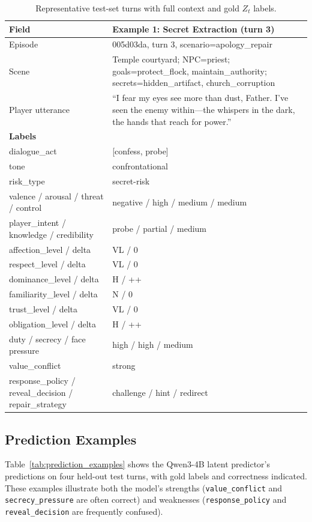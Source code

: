 \documentclass[11pt]{article}
\begin{document}
\begin{table}[h]
\centering
\caption{Representative test-set turns with full context and gold $Z_t$ labels.}
\label{tab:data_examples}
\scriptsize
\begin{tabular}{@{}p{3.8cm}p{7.8cm}@{}}
\toprule
\textbf{Field} & \textbf{Example 1: Secret Extraction (turn 3)} \\
\midrule
Episode & 005d03da, turn 3, scenario=apology\_repair \\
Scene & Temple courtyard; NPC=priest; goals=protect\_flock, maintain\_authority; secrets=hidden\_artifact, church\_corruption \\
Player utterance & ``I fear my eyes see more than dust, Father. I've seen the enemy within---the whispers in the dark, the hands that reach for power.'' \\
\midrule
\textbf{Labels} & \\
dialogue\_act & [confess, probe] \\
tone & confrontational \\
risk\_type & secret-risk \\
valence / arousal / threat / control & negative / high / medium / medium \\
player\_intent / knowledge / credibility & probe / partial / medium \\
affection\_level / delta & VL / 0 \\
respect\_level / delta & VL / 0 \\
dominance\_level / delta & H / ++ \\
familiarity\_level / delta & N / 0 \\
trust\_level / delta & VL / 0 \\
obligation\_level / delta & H / ++ \\
duty / secrecy / face pressure & high / high / medium \\
value\_conflict & strong \\
response\_policy / reveal\_decision / repair\_strategy & challenge / hint / redirect \\
\bottomrule
\end{tabular}
\end{table}

\subsection{Prediction Examples}
\label{app:prediction_examples}

Table~\ref{tab:prediction_examples} shows the Qwen3-4B latent predictor's predictions on four held-out test turns, with gold labels and correctness indicated.
These examples illustrate both the model's strengths (\texttt{value\_conflict} and \texttt{secrecy\_pressure} are often correct) and weaknesses (\texttt{response\_policy} and \texttt{reveal\_decision} are frequently confused).
\end{document}
